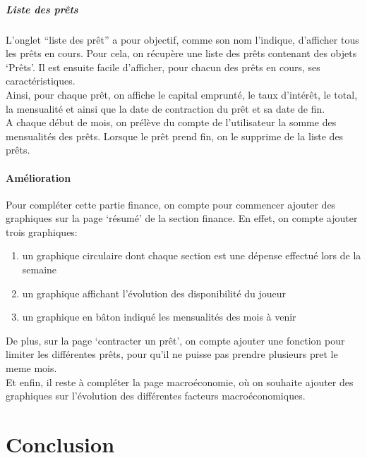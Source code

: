 \subsubsection{Liste des prêts}
L'onglet “liste des prêt” a pour objectif, comme son nom l’indique, d’afficher tous les prêts en cours. Pour cela, on récupère une liste des prêts contenant des objets ‘Prêts’. Il est ensuite facile d’afficher, pour chacun des prêts en cours, ses caractéristiques. \\
Ainsi, pour chaque prêt, on affiche le capital emprunté, le taux d'intérêt, le total, la mensualité et ainsi que la date de contraction du prêt et sa date de fin. \\


A chaque début de mois, on prélève du compte de l’utilisateur la somme des mensualités des prêts.
Lorsque le prêt prend fin, on le supprime de la liste des prêts.



\subsection{Amélioration}
Pour compléter cette partie finance, on compte pour commencer ajouter des graphiques sur la page ‘résumé’ de la section finance. En effet, on compte ajouter trois graphiques:



\begin{enumerate}
\item un graphique circulaire dont chaque section est une dépense effectué lors de la semaine
\item un graphique affichant l’évolution des disponibilité du joueur
\item un graphique en bâton indiqué les mensualités des mois à venir
\end{enumerate}



De plus, sur la page ‘contracter un prêt’, on compte ajouter une fonction pour limiter les différentes prêts, pour qu’il ne puisse pas prendre plusieurs pret le meme mois. \\
Et enfin, il reste à compléter la page macroéconomie, où on souhaite ajouter des graphiques sur l’évolution des différentes facteurs macroéconomiques.



\part{Conclusion}




